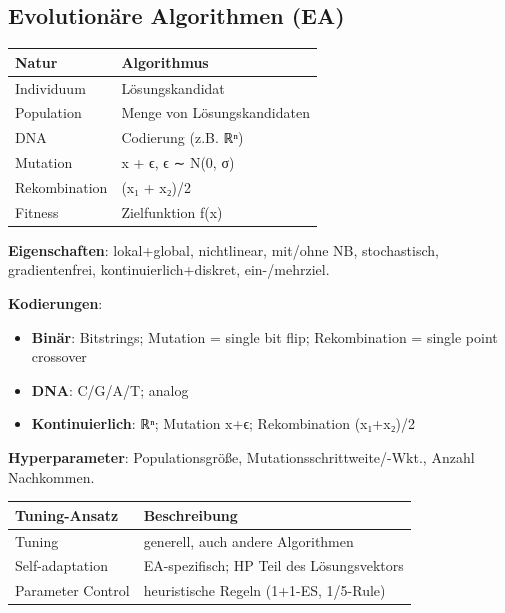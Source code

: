 \documentclass[11pt, a4paper]{article}
\begin{document}
\subsection{Evolutionäre Algorithmen (EA)}


{\small
\begin{tabularx}{\linewidth}{XX}
\hline
\rowcolor{tableheadbg}
{\color{white}\textbf{Natur}} & {\color{white}\textbf{Algorithmus}} \\[2pt]
\hline
\endhead
\hline
\endfoot
Individuum & Lösungskandidat \\
Population & Menge von Lösungskandidaten \\
DNA & Codierung (z.B. ℝⁿ) \\
Mutation & x⃗ + ϵ, ϵ ∼ N(0, σ) \\
Rekombination & (x⃗₁ + x⃗₂)/2 \\
Fitness & Zielfunktion f(x⃗) \\
\end{tabularx}
}


\textbf{Eigenschaften}: lokal+global, nichtlinear, mit/ohne NB, stochastisch, gradientenfrei, kontinuierlich+diskret, ein-/mehrziel.


\textbf{Kodierungen}:

\begin{itemize}
  \item \textbf{Binär}: Bitstrings; Mutation = single bit flip; Rekombination = single point crossover
  \item \textbf{DNA}: C/G/A/T; analog
  \item \textbf{Kontinuierlich}: ℝⁿ; Mutation x⃗+ϵ; Rekombination (x⃗₁+x⃗₂)/2
\end{itemize}

\textbf{Hyperparameter}: Populationsgröße, Mutationsschrittweite/-Wkt., Anzahl Nachkommen.



{\small
\begin{tabularx}{\linewidth}{XX}
\hline
\rowcolor{tableheadbg}
{\color{white}\textbf{Tuning-Ansatz}} & {\color{white}\textbf{Beschreibung}} \\[2pt]
\hline
\endhead
\hline
\endfoot
Tuning & generell, auch andere Algorithmen \\
Self-adaptation & EA-spezifisch; HP Teil des Lösungsvektors \\
Parameter Control & heuristische Regeln (1+1-ES, 1/5-Rule) \\
\end{tabularx}
}
\end{document}
